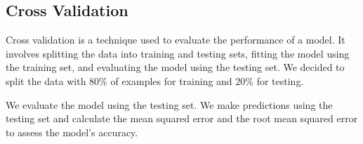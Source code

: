 \documentclass[
]{article}
\newenvironment{Shaded}{\begin{snugshade}}{\end{snugshade}}
\newcommand{\AttributeTok}[1]{\textcolor[rgb]{0.13,0.29,0.53}{#1}}
\newcommand{\ConstantTok}[1]{\textcolor[rgb]{0.56,0.35,0.01}{#1}}
\newcommand{\DecValTok}[1]{\textcolor[rgb]{0.00,0.00,0.81}{#1}}
\newcommand{\FloatTok}[1]{\textcolor[rgb]{0.00,0.00,0.81}{#1}}
\newcommand{\FunctionTok}[1]{\textcolor[rgb]{0.13,0.29,0.53}{\textbf{#1}}}
\newcommand{\NormalTok}[1]{#1}
\newcommand{\OtherTok}[1]{\textcolor[rgb]{0.56,0.35,0.01}{#1}}
\newcommand{\SpecialCharTok}[1]{\textcolor[rgb]{0.81,0.36,0.00}{\textbf{#1}}}
\newcommand{\StringTok}[1]{\textcolor[rgb]{0.31,0.60,0.02}{#1}}
\begin{document}
\subsection{Cross Validation}\label{cross-validation}

Cross validation is a technique used to evaluate the performance of a
model. It involves splitting the data into training and testing sets,
fitting the model using the training set, and evaluating the model using
the testing set. We decided to split the data with \(80\)\% of examples
for training and \(20\)\% for testing.

\begin{Shaded}
\end{Shaded}

We evaluate the model using the testing set. We make predictions using
the testing set and calculate the mean squared error and the root mean
squared error to assess the model's accuracy.

\begin{Shaded}
\end{Shaded}
\end{document}

